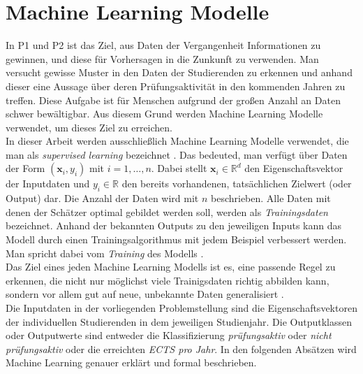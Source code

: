
\section{Machine Learning Modelle}
\label{sec:ml}

In P1 und P2 ist das Ziel, aus Daten der Vergangenheit Informationen zu gewinnen, und diese f\"ur Vorhersagen in die Zunkunft zu verwenden.
Man versucht gewisse Muster in den Daten der Studierenden zu erkennen und anhand dieser eine Aussage \"uber deren Pr\"ufungsaktivit\"at in den kommenden Jahren zu treffen.
Diese Aufgabe ist f\"ur Menschen aufgrund der gro{\ss}en Anzahl an Daten schwer bew\"altigbar. Aus diesem Grund werden Machine Learning Modelle verwendet,
um dieses Ziel zu erreichen. \\

In dieser Arbeit werden ausschlie{\ss}lich Machine Learning Modelle verwendet, die man als \textit{supervised learning} bezeichnet \cite{shalev}. 
Das bedeuted, man verf\"ugt \"uber Daten der Form $(\mathbf{x}_i, y_i)$ mit $i = 1,\dots,n$. Dabei stellt $\mathbf{x}_i \in \mathbb{R}^d$ den Eigenschaftsvektor 
der Inputdaten und $y_i \in \mathbb{R}$ den bereits vorhandenen, tats\"achlichen Zielwert (oder Output) dar. Die Anzahl der Daten wird mit $n$ beschrieben. Alle Daten mit denen der 
Sch\"atzer optimal gebildet werden soll, werden als \textit{Trainingsdaten} bezeichnet. 
Anhand der bekannten Outputs zu den jeweiligen Inputs kann das Modell durch einen Trainingsalgorithmus mit jedem Beispiel verbessert werden.
Man spricht dabei vom \textit{Training} des Modells \cite{shalev}. \\

Das Ziel eines jeden Machine Learning Modells ist es, eine passende Regel zu erkennen, die nicht nur m\"oglichst viele Trainigsdaten richtig abbilden kann, sondern vor allem 
gut auf neue, unbekannte Daten generalisiert \cite{strang}. \\

Die Inputdaten in der vorliegenden Problemstellung sind die Eigenschaftsvektoren der individuellen Studierenden in dem jeweiligen Studienjahr. Die Outputklassen oder 
Outputwerte sind entweder die Klassifizierung \textit{pr\"ufungsaktiv} oder \textit{nicht pr\"ufungsaktiv} oder die erreichten \textit{ECTS pro Jahr}. 
In den folgenden Abs\"atzen wird Machine Learning genauer erkl\"art und formal beschrieben. \\



